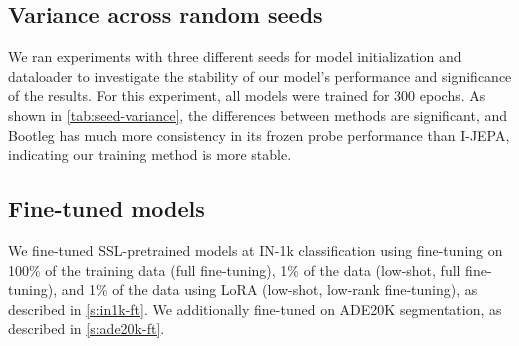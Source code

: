 \subsection{Variance across random seeds}

We ran experiments with three different seeds for model initialization and dataloader to investigate the stability of our model's performance and significance of the results.
For this experiment, all models were trained for 300 epochs.
As shown in \cref{tab:seed-variance}, the differences between methods are significant, and Bootleg has much more consistency in its frozen probe performance than I-JEPA, indicating our training method is more stable.



\begin{table}[tbh]
\centering
\caption{Variance under change in random seed. We trained MAE, I-JEPA, and Bootleg (final hparams) ViT-S models for 300 ep. on IN-1k with three random seeds for both init and dataloader. Results are shown as mean $\pm$ stdev.}
\label{tab:seed-variance}
\small
{}
\end{table}


\FloatBarrier
\subsection{Fine-tuned models}
\label{s:results-ft}

We fine-tuned SSL-pretrained models at IN-1k classification using fine-tuning on 100\% of the training data (full fine-tuning), 1\% of the data (low-shot, full fine-tuning), and 1\% of the data using LoRA (low-shot, low-rank fine-tuning), as described in \cref{s:in1k-ft}.
We additionally fine-tuned on ADE20K segmentation, as described in \cref{s:ade20k-ft}.

